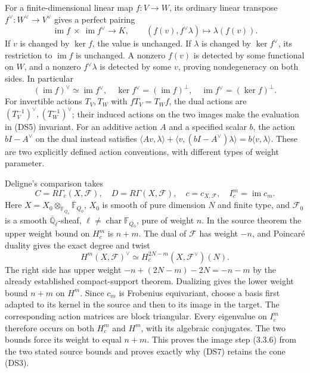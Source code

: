 \documentclass{article}
\begin{document}
For a finite-dimensional linear map $f:V\to W$, its ordinary linear
transpose $f^\vee:W^\vee\to V^\vee$ gives a perfect pairing
\[
 \operatorname{im}f\ \times\ \operatorname{im}f^\vee\longrightarrow K,
 \qquad (f(v),f^\vee\lambda)\longmapsto\lambda(f(v)).
 \tag{DS5}
\]
If $v$ is changed by $\ker f$, the value is unchanged.  If $\lambda$
is changed by $\ker f^\vee$, its restriction to $\operatorname{im}f$
is unchanged.  A nonzero $f(v)$ is detected by some functional on $W$,
and a nonzero $f^\vee\lambda$ is detected by some $v$, proving
nondegeneracy on both sides.  In particular
\[
 (\operatorname{im}f)^\vee\simeq\operatorname{im}f^\vee,
 \quad \ker f^\vee=(\operatorname{im}f)^\perp,
 \quad \operatorname{im}f^\vee=(\ker f)^\perp.
 \tag{DS6}
\]
For invertible actions $T_V,T_W$ with $fT_V=T_Wf$, the dual actions
are $(T_V^{-1})^\vee,(T_W^{-1})^\vee$; their induced actions on
the two images make the evaluation in (DS5) invariant.  For an additive
action $A$ and a specified scalar $b$, the action $bI-A^\vee$ on the
dual instead satisfies
$\langle Av,\lambda\rangle+\langle v,(bI-A^\vee)\lambda\rangle
=b\langle v,\lambda\rangle$.  These are two explicitly defined
action conventions, with different types of weight parameter.

Deligne's comparison takes
\[
 C=R\Gamma_c(X,\mathcal F),\quad D=R\Gamma(X,\mathcal F),\quad
 c=c_{X,\mathcal F},\quad I_c^m=\operatorname{im}c_m.
 \tag{DS7}
\]
Here $X=X_0\otimes_{\mathbb F_{Q_0}}\overline{\mathbb F}_{Q_0}$,
$X_0$ is smooth of pure dimension $N$ and finite type, and
$\mathcal F_0$ is a smooth $\overline{\mathbb Q}_\ell$-sheaf,
$\ell\ne\operatorname{char}\mathbb F_{Q_0}$, pure of weight $n$.
In the source theorem the upper weight bound on $H_c^m$ is $n+m$.
The dual of $\mathcal F$ has weight $-n$, and Poincar\'e duality gives
the exact degree and twist
\[
 H^m(X,\mathcal F)^\vee
 \simeq H_c^{2N-m}(X,\mathcal F^\vee)(N).
 \tag{DS8}
\]
The right side has upper weight
$-n+(2N-m)-2N=-n-m$ by the already established compact-support
theorem.  Dualizing gives the lower weight bound $n+m$ on $H^m$.
Since $c_m$ is Frobenius equivariant, choose a basis first adapted to
its kernel in the source and then to its image in the target.
The corresponding action matrices are block triangular.  Every
eigenvalue on $I_c^m$ therefore occurs on both $H_c^m$ and $H^m$,
with its algebraic conjugates.  The two bounds force its weight to
equal $n+m$.  This proves the image step (3.3.6) from the two stated
source bounds and proves exactly why (DS7) retains the cone (DS3).
\end{document}
